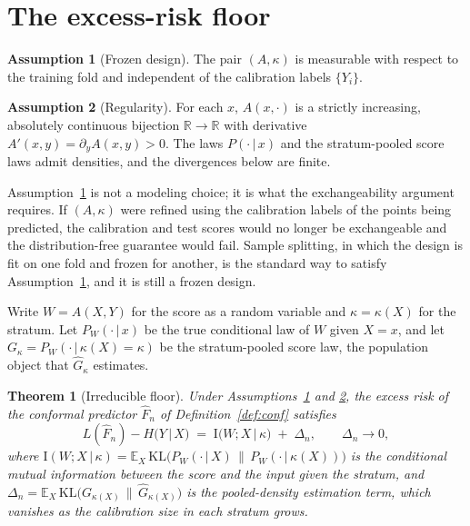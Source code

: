 \documentclass[11pt]{article}
\newtheorem{theorem}{Theorem}
\theoremstyle{definition}
\newtheorem{assumption}{Assumption}
\theoremstyle{remark}
\newcommand{\R}{\mathbb{R}}
\newcommand{\E}{\mathbb{E}}
\newcommand{\I}{\mathrm{I}}
\newcommand{\KL}{\mathrm{KL}}
\newcommand{\given}{\,|\,}
\begin{document}
\section{The excess-risk floor}

\begin{assumption}[Frozen design]\label{as:frozen}
The pair $(A,\kappa)$ is measurable with respect to the training fold and independent
of the calibration labels $\{Y_i\}$.
\end{assumption}

\begin{assumption}[Regularity]\label{as:reg}
For each $x$, $A(x,\cdot)$ is a strictly increasing, absolutely continuous bijection
$\R \to \R$ with derivative $A'(x,y) = \partial_y A(x,y) > 0$. The laws
$P(\cdot\given x)$ and the stratum-pooled score laws admit densities, and the
divergences below are finite.
\end{assumption}

Assumption~\ref{as:frozen} is not a modeling choice; it is what the exchangeability
argument requires. If $(A,\kappa)$ were refined using the calibration labels of the
points being predicted, the calibration and test scores would no longer be exchangeable
and the distribution-free guarantee would fail. Sample splitting, in which the design is
fit on one fold and frozen for another, is the standard way to satisfy
Assumption~\ref{as:frozen}, and it is still a frozen design.

Write $W = A(X,Y)$ for the score as a random variable and $\kappa = \kappa(X)$ for the
stratum. Let $P_W(\cdot\given x)$ be the true conditional law of $W$ given $X=x$, and let
$G_\kappa = P_W(\cdot\given \kappa(X)=\kappa)$ be the stratum-pooled score law, the
population object that $\widehat G_\kappa$ estimates.

\begin{theorem}[Irreducible floor]\label{thm:floor}
Under Assumptions~\ref{as:frozen} and \ref{as:reg}, the excess risk of the conformal
predictor $\widehat F_n$ of Definition~\ref{def:conf} satisfies
\begin{equation}\label{eq:floor}
  L(\widehat F_n) - H(Y\given X)
  \;=\; \I\big( W ; X \given \kappa \big) \;+\; \Delta_n ,
  \qquad \Delta_n \to 0 ,
\end{equation}
where $\I(W;X\given\kappa) = \E_X\,\KL\!\big(P_W(\cdot\given X)\,\|\,P_W(\cdot\given
\kappa(X))\big)$ is the conditional mutual information between the score and the input
given the stratum, and $\Delta_n = \E_X\,\KL\big(G_{\kappa(X)}\,\|\,\widehat
G_{\kappa(X)}\big)$ is the pooled-density estimation term, which vanishes as the
calibration size in each stratum grows.
\end{theorem}
\end{document}

